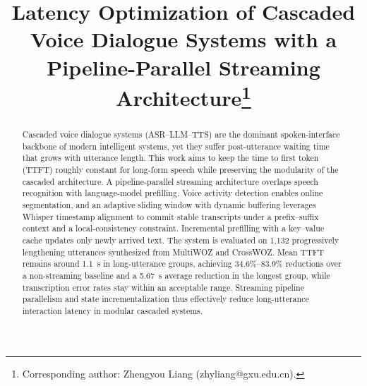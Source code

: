 \documentclass[conference]{IEEEtran}
\begin{document}
\title{Latency Optimization of Cascaded Voice Dialogue Systems with a Pipeline-Parallel Streaming Architecture\thanks{Corresponding author: Zhengyou Liang (zhyliang@gxu.edu.cn).}}

\author{
\and
{}
}

\maketitle

\begin{abstract}
Cascaded voice dialogue systems (ASR--LLM--TTS) are the dominant spoken-interface backbone of modern intelligent systems, yet they suffer post-utterance waiting time that grows with utterance length. This work aims to keep the time to first token (TTFT) roughly constant for long-form speech while preserving the modularity of the cascaded architecture. A pipeline-parallel streaming architecture overlaps speech recognition with language-model prefilling. Voice activity detection enables online segmentation, and an adaptive sliding window with dynamic buffering leverages Whisper timestamp alignment to commit stable transcripts under a prefix--suffix context and a local-consistency constraint. Incremental prefilling with a key--value cache updates only newly arrived text. The system is evaluated on 1,132 progressively lengthening utterances synthesized from MultiWOZ and CrossWOZ. Mean TTFT remains around 1.1~s in long-utterance groups, achieving 34.6\%--83.9\% reductions over a non-streaming baseline and a 5.67~s average reduction in the longest group, while transcription error rates stay within an acceptable range. Streaming pipeline parallelism and state incrementalization thus effectively reduce long-utterance interaction latency in modular cascaded systems.
\end{abstract}
\end{document}
